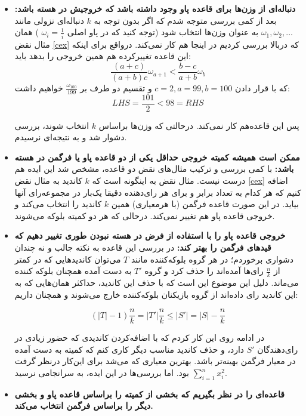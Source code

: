 \documentclass[12pt]{article}
\begin{document}
\begin{itemize}
    \item \textbf{دنباله‌ای از وزن‌ها برای قاعده پاو وجود داشته باشد که خروجیش در هسته باشد:}
    بعد از کمی بررسی متوجه شدم که اگر بدون توجه به $k$
     دنباله‌ای نزولی مانند
    $\omega_1, \omega_2, \dots$
    به عنوان وزن‌ها انتخاب شود (توجه کنید که در پاو اصلی 
    $\omega_i =\frac{1}{i}$
    )
    همان مثال نقض 
    \autoref{cex}
    که دربالا بررسی کردیم در اینجا هم کار نمی‌کند. درواقع 
    برای اینکه این قاعده تغییرکرده هم همین خروجی را بدهد باید:
    \[
    \frac{(a+c)}{(a+b)c} \omega_{a+1} < \frac{b-c}{a+b} \omega_b
    \]
    که با قرار دادن
    $c=2, a=99, b=100$
    و تقسیم دو طرف بر
    $\frac{\omega_{100}}{199}$
    خواهیم داشت:
    \[
    LHS  = \frac{101}{2} < 98 = RHS
    \]

    پس این قاعده‌هم کار نمی‌کند. درحالتی که وزن‌ها براساس $k$
    انتخاب شوند، بررسی دشوار شد و به نتیجه‌ای نرسیدم.
    \item
    \textbf{
        ممکن است همیشه کمیته‌ خروجی حداقل یکی از دو قاعده پاو یا فرگمن در هسته باشد:}
        با کمی بررسی و ترکیب مثال‌های نقض دو قاعده، مشخص شد این ایده
        هم درست نیست. مثال نقض به اینگونه است که $k$
        کاندید به مثال نقض 
        \autoref{cex}
        اضافه کنیم که هر کدام به تعداد برابر و برای هر رای‌دهنده دقیقا یک‌بار
        در مجموعه‌رای آنها بیاید. در این صورت قاعده فرگمن (با هرمعیاری)
        همین $k$
        کاندید را انتخاب می‌کند و خروجی قاعده پاو هم تغییر نمی‌کند. درحالی که هر
        دو کمیته بلوکه می‌شوند.
    \item \textbf{
        خروجی قاعده پاو را با استفاده از فرض در هسته نبودن طوری تغییر دهیم که قیدهای فرگمن را بهتر کند:}
در بررسی این قاعده به نکته جالب و نه چندان دشواری برخوردم؛ در هر گروه بلوکه‌کننده
مانند $T$ 
می‌توان کاندیدهایی که در کمتر از $\frac{n}{k}$
رای‌ها آمده‌اند را حذف کرد و گروه $T'$
به دست آمده همچنان بلوکه کننده می‌ماند. دلیل این موضوع این است که  
با حذف این کاندید، حداکثر همان‌هایی که به این کاندید رای‌‌ داده‌اند
از گروه بازیکنان بلوکه‌کننده خارج می‌شوند و همچنان داریم:

\[
\left(\left|T\right| - 1 \right) \frac{n}{k} = \left|T'\right| \frac{n}{k} \le \left|S'\right| = \left|S\right| - \frac{n}{k}
\]

در ادامه روی این کار کردم که با اضافه‌کردن کاندیدی که حضور زیادی در 
رای‌دهندگان $S'$
دارد، و حذف کاندید مناسب دیگر کاری کنم که کمیته به دست آمده در معیار فرگمن
بهینه‌تر باشد. بهترین معیاری که می‌شد برای این‌کار درنظر گرفت
$\sum_{i = 1}^{n} x_i ^2$
بود. اما بررسی‌ها در این ایده، به سرانجامی نرسید.

    \item
    \textbf{
        قاعده‌ای را در نظر بگیریم که بخشی از کمیته را براساس قاعده پاو و بخشی دیگر را براساس فرگمن انتخاب می‌کند.
        }

\end{itemize}
\end{document}
